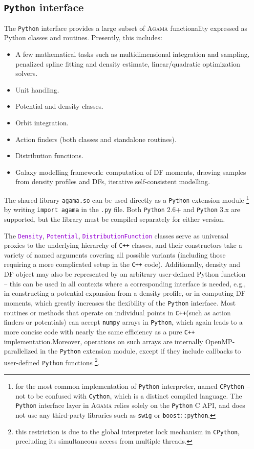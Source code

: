\documentclass[12pt]{article}
\newcommand{\Agama}{\textsc{Agama}\xspace}
\newcommand{\Cpp}  {\texttt{C++}\xspace}
\newcommand{\Python}{\texttt{Python}\xspace}
\newcommand{\ttt}[1]{\textcolor{darkviolet}{\texttt{#1}}}
\begin{document}
\subsection{\Python interface}  \label{sec:Python}

The \Python interface provides a large subset of \Agama functionality expressed as Python classes and routines. Presently, this includes:
\begin{itemize}  \setlength{\parskip}{2pt} \setlength{\itemsep}{2pt}
\item A few mathematical tasks such as multidimensional integration and sampling, penalized spline fitting and density estimate, linear/quadratic optimization solvers.
\item Unit handling.
\item Potential and density classes.
\item Orbit integration.
\item Action finders (both classes and standalone routines).
\item Distribution functions.
\item Galaxy modelling framework: computation of DF moments, drawing samples from density profiles and DFs, iterative self-consistent modelling.
\end{itemize}

The shared library \texttt{agama.so} can be used directly as a \Python extension module%
\footnote{for the most common implementation of \Python interpreter, named \texttt{CPython} -- not to be confused with \texttt{Cython}, which is a distinct compiled language. The \Python interface layer in \Agama relies solely on the \Python C API, and does not use any third-party libraries such as \texttt{swig} or \texttt{boost::python}.}
by writing \texttt{import agama} in the \texttt{.py} file. Both \Python 2.6+ and \Python 3.x are supported, but the library must be compiled separately for either version.

The \ttt{Density}, \ttt{Potential}, \ttt{DistributionFunction} classes serve as universal proxies to the underlying hierarchy of \Cpp classes, and their constructors take a variety of named arguments covering all possible variants (including those requiring a more complicated setup in the \Cpp code).
Additionally, density and DF object may also be represented by an arbitrary user-defined Python function -- this can be used in all contexts where a corresponding interface is needed, e.g., in constructing a potential expansion from a density profile, or in computing DF moments, which greatly increases the flexibility of the \Python interface. Most routines or methods that operate on individual points in \Cpp (such as action finders or potentials) can accept \texttt{numpy} arrays in \Python, which again leads to a more concise code with nearly the same efficiency as a pure \Cpp implementation.Moreover, operations on such arrays are internally OpenMP-parallelized in the \Python extension module, except if they include callbacks to user-defined \Python functions%
\footnote{this restriction is due to the global interpreter lock mechanism in \texttt{CPython}, precluding its simultaneous access from multiple threads.}.
\end{document}
